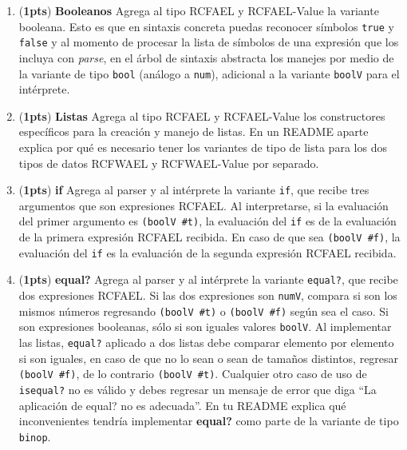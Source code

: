 \documentclass{article}
\newcommand{\grade}[1]{(\textbf{#1pts}) }
\begin{document}
\begin{enumerate}

\item \grade{1} \textbf{Booleanos} Agrega al tipo RCFAEL y RCFAEL-Value la variante booleana. Esto es que en sintaxis concreta puedas reconocer símbolos \texttt{true} y \texttt{false} y al momento de procesar la lista de símbolos de una expresión que los incluya con \emph{parse}, en el árbol de sintaxis abstracta los manejes por medio de la variante de tipo \texttt{bool} (análogo a \texttt{num}), adicional a la variante \texttt{boolV} para el intérprete. \\

\item \grade{1} \textbf{Listas} Agrega al tipo RCFAEL y RCFAEL-Value los constructores específicos para la creación y manejo de listas. En un README aparte explica por qué es necesario tener los variantes de tipo de lista para los dos tipos de datos RCFWAEL y RCFWAEL-Value por separado. \\

\item \grade{1} \textbf{if} Agrega al parser y al intérprete la variante \texttt{if}, que recibe tres argumentos que son expresiones RCFAEL. Al interpretarse, si la evaluación del primer argumento es \texttt{(boolV \#t)}, la evaluación del \texttt{if} es de la evaluación de la primera expresión RCFAEL recibida. En caso de que sea \texttt{(boolV \#f)}, la evaluación del \texttt{if} es la evaluación de la segunda expresión RCFAEL recibida. \\

\item \grade{1} \textbf{equal?} Agrega al parser y al intérprete la variante \texttt{equal?}, que recibe dos expresiones RCFAEL. Si las dos expresiones son \texttt{numV}, compara si son los mismos números regresando \texttt{(boolV \#t)} o \texttt{(boolV \#f)} según sea el caso. Si son expresiones booleanas, sólo si son iguales valores \texttt{boolV}. Al implementar las listas, \texttt{equal?} aplicado a dos listas debe comparar elemento por elemento si son iguales, en caso de que no lo sean o sean de tamaños distintos, regresar \texttt{(boolV \#f)}, de lo contrario \texttt{(boolV \#t)}. Cualquier otro caso de uso de \texttt{isequal?} no es válido y debes regresar un mensaje de error que diga ``La aplicación de equal? no es adecuada''. En tu README explica qué inconvenientes tendría implementar \textbf{equal?} como parte de la variante de tipo \texttt{binop}. \\


\end{enumerate}
\end{document}
